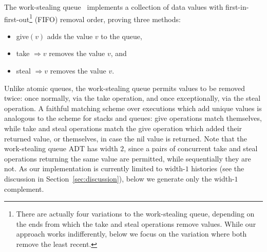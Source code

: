 The work-stealing queue~\cite{journals/dc/HendlerLMS06} implements a collection
of data values with first-in-first-out\footnote{There are actually four
variations to the work-stealing queue, depending on the ends from which the
take and steal operations remove values. While our approach works
indifferently, below we focus on the variation where both remove the least
recent.} (FIFO) removal order, proving three methods:
\begin{itemize}

  \item give$(v)$ adds the value $v$ to the queue,

  \item take $\Rightarrow v$ removes the value $v$, and

  \item steal $\Rightarrow v$ removes the value $v$.

\end{itemize}
Unlike atomic queues, the work-stealing queue permits values to be removed
twice: once normally, via the take operation, and once exceptionally, via the
steal operation. A faithful matching scheme over executions which add
unique values is analogous to the scheme for stacks and queues: give
operations match themselves, while take and steal operations match the give
operation which added their returned value, or themselves, in case the nil
value is returned. Note that the work-stealing queue ADT has width $2$,
since a pairs of concurrent take and steal operations returning the same value
are permitted, while sequentially they are not. As our implementation is
currently limited to width-$1$ histories (see the discussion in
Section~\ref{sec:discussion}), below we generate only the width-$1$ complement.

